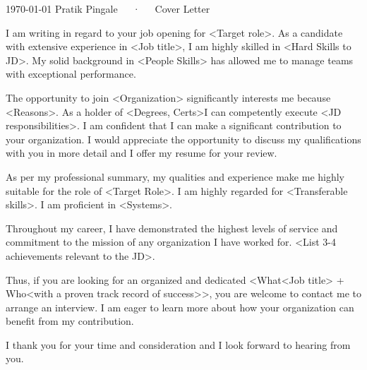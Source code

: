 \documentclass[11pt, a4paper]{awesome-cv}
\begin{document}
\makecvheader[R]

\makecvfooter
  {\today}
  {Pratik Pingale~~~·~~~Cover Letter}
  {}

\makelettertitle

\begin{cvletter}


I am writing in regard to your job opening for <Target role>. As a candidate with extensive experience in <Job title>, I am highly skilled in <Hard Skills to JD>. My solid background in <People Skills> has allowed me to manage teams with exceptional performance.

The opportunity to join <Organization> significantly interests me because <Reasons>. As a holder of <Degrees, Certs>I can competently execute <JD responsibilities>.
I am confident that I can make a significant contribution to your organization. I would appreciate the opportunity to discuss my qualifications with you in more detail and I offer my resume for your review.

As per my professional summary, my qualities and experience make me highly suitable for the role of <Target Role>.
I am highly regarded for <Transferable skills>. I am proficient in <Systems>.

Throughout my career, I have demonstrated the highest levels of service and commitment to the mission of any organization I have worked for. <List 3-4 achievements relevant to the JD>.

Thus, if you are looking for an organized and dedicated <What<Job title> + Who<with a proven track record of success>>, you are welcome to contact me to arrange an interview. I am eager to learn more about how your organization can benefit from my contribution.

I thank you for your time and consideration and I look forward to hearing from you.

\end{cvletter}


\makeletterclosing
\end{document}
